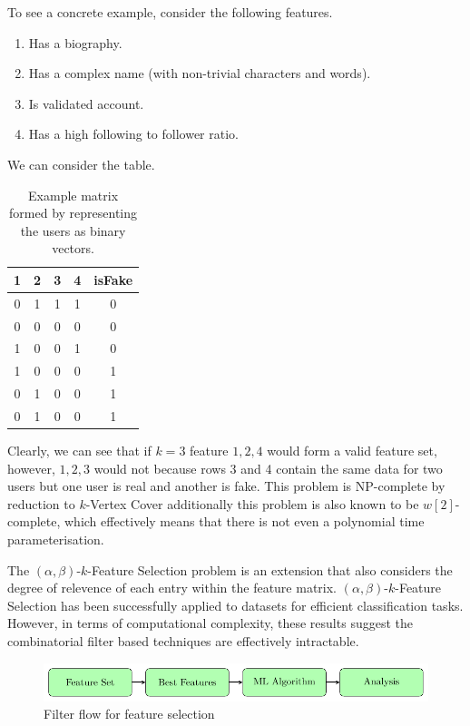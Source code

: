 \documentclass[conference]{IEEEtran}
\begin{document}
To see a concrete example, consider the following features.

\begin{enumerate}
	\item Has a biography.
	\item Has a complex name (with non-trivial characters and words).
	\item Is validated account.
	\item Has a high following to follower ratio.
\end{enumerate}

We can consider the table.

\begin{table}[h!]
	\centering
	\begin{tabular}{| c c c c | c |}
		\hline
		1 & 2 & 3 & 4 & isFake \\ [0.5ex]
		\hline
		0 & 1 & 1 & 1 & 0      \\
		0 & 0 & 0 & 0 & 0      \\
		1 & 0 & 0 & 1 & 0      \\
		1 & 0 & 0 & 0 & 1      \\
		0 & 1 & 0 & 0 & 1      \\
		0 & 1 & 0 & 0 & 1      \\ [1ex]
		\hline
	\end{tabular}
	\caption{Example matrix formed by representing the users as binary vectors.}
	\label{table:k-feat-select-example}
\end{table}

Clearly, we can see that if $k=3$ feature $1,2,4$ would form a valid feature set, however, $1,2,3$ would not because rows 3 and 4 contain the same data for two users but one user is real and another is fake. This problem is NP-complete by reduction to $k$-Vertex Cover\cite{DaviesRussell1994} additionally this problem is also known to be $w[2]$-complete\cite{CottaMoscato2003}, which effectively means that there is not even a polynomial time parameterisation.

The $(\alpha,\beta)$-$k$-Feature Selection problem is an extension that also considers the degree of relevence of each entry within the feature matrix. $(\alpha,\beta)$-$k$-Feature Selection has been successfully applied to datasets for efficient classification tasks\cite{MathiesonEtAl2017,NaeniSalehipour2021,RochadePaulaEtAl2016}. However, in terms of computational complexity, these results suggest the combinatorial filter based techniques are effectively intractable.

\begin{figure}[h]
	\begin{center}
		\includegraphics[scale=0.5]{filter-flow.pdf}
		\caption{Filter flow for feature selection}\label{fig:feat-filter-flow}
	\end{center}
\end{figure}
\end{document}
